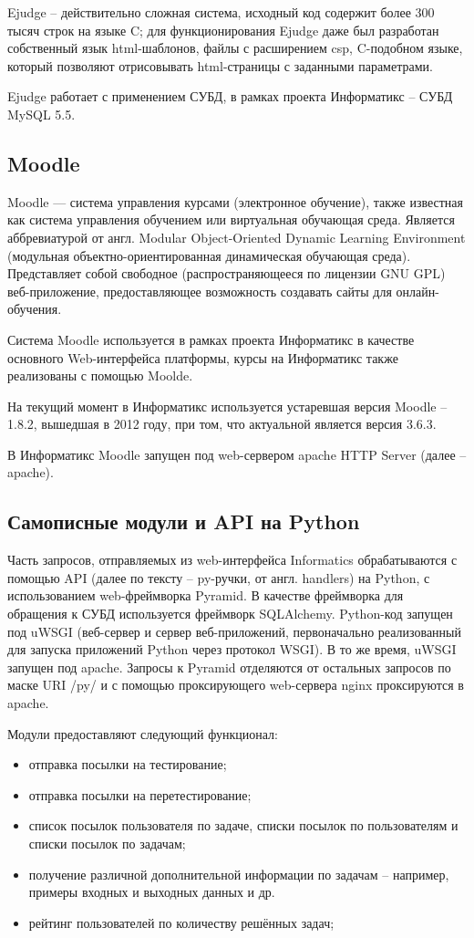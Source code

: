 Ejudge -- действительно сложная система, исходный код содержит более 300 тысяч строк на языке C; 
для функционирования Ejudge даже был разработан собственный язык html-шаблонов, файлы с расширением csp, C-подобном языке,
который позволяют отрисовывать html-страницы с заданными параметрами. 

Ejudge работает с применением СУБД, в рамках проекта Информатикс -- СУБД MySQL 5.5.

\subsection{Moodle}

Moodle — система управления курсами (электронное обучение), также известная как система управления обучением или виртуальная обучающая среда. Является аббревиатурой от англ. Modular Object-Oriented Dynamic Learning Environment (модульная объектно-ориентированная динамическая обучающая среда). Представляет собой свободное (распространяющееся по лицензии GNU GPL) веб-приложение, предоставляющее возможность создавать сайты для онлайн-обучения.

Система Moodle используется в рамках проекта Информатикс в качестве основного Web-интерфейса платформы, 
курсы на Информатикс также реализованы с помощью Moolde.

На текущий момент в Информатикс используется устаревшая версия Moodle -- 1.8.2, вышедшая в 2012 году, при том, что актуальной является версия 3.6.3.

В Информатикс Moodle запущен под web-сервером apache HTTP Server (далее -- apache).

\subsection{Самописные модули и API на Python}

Часть запросов, отправляемых из web-интерфейса Informatics обрабатываются с помощью API (далее по тексту -- py-ручки, от англ. handlers) на Python, с использованием web-фреймворка Pyramid.
В качестве фреймворка для обращения к СУБД используется фреймворк SQLAlchemy.
Python-код запущен под uWSGI (веб-сервер и сервер веб-приложений, первоначально реализованный для запуска приложений Python через протокол WSGI). В то же время, uWSGI запущен под apache.
Запросы к Pyramid отделяются от остальных запросов по маске URI /py/ и с помощью проксирующего web-сервера nginx проксируются в apache.

Модули предоставляют следующий функционал:
\begin{itemize}
    \item отправка посылки на тестирование;
    \item отправка посылки на перетестирование;
    \item список посылок пользователя по задаче, списки посылок по пользователям и списки посылок по задачам;
    \item получение различной дополнительной информации по задачам -- например, примеры входных и выходных данных и др.
    \item рейтинг пользователей по количеству решённых задач;
\end{itemize}

